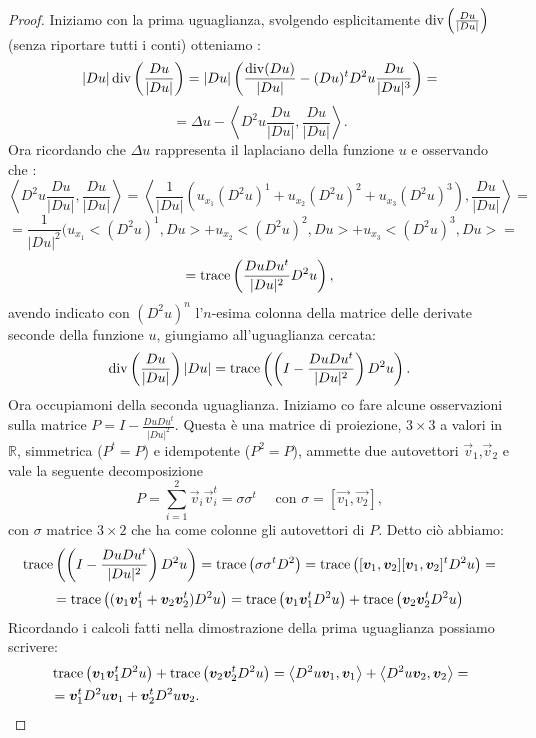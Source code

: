 \begin{proof}
Iniziamo con la prima uguaglianza, svolgendo esplicitamente $\operatorname{div}\left(\frac{Du}{|Du|}\right)$ (senza riportare tutti i conti) otteniamo :
\[
|Du|\operatorname{div}\left(\frac{Du}{|Du|}\right)=|Du|\left(\frac{\operatorname{div}(Du)}{|Du|} -(Du)^tD^2u\frac{Du}{|Du|^3}\right) =
\]
\[
= \Delta u - \left<D^2u\frac{Du}{|Du|},\frac{Du}{|Du|}\right> .
\]
Ora ricordando che $\Delta u$ rappresenta il laplaciano della funzione $u$ e osservando che :
\[
\left<D^2u\frac{Du}{|Du|},\frac{Du}{|Du|}\right> = \left<\frac{1}{|Du|}(u_{x_1}(D^2u)^1+u_{x_2}(D^2u)^2+u_{x_3}(D^2u)^3),\frac{Du}{|Du|}\right> =
\]
\[
=\frac{1}{|Du|^2}(u_{x_1}<(D^2u)^1,Du>+u_{x_2}<(D^2u)^2,Du>+u_{x_3}<(D^2u)^3,Du> = 
\]
\[
=\operatorname{trace}\left(\frac{DuDu^t}{|Du|^2}D^2u\right),
\]
avendo indicato con $(D^2u)^n$ l'$n$-esima colonna della matrice delle derivate seconde della funzione $u$, giungiamo all'uguaglianza cercata:
\[
\operatorname{div}\left(\frac{Du}{|Du|}\right)|Du| = \operatorname{trace}\left(\left(I-{\frac{DuDu^t}{|Du|^2}}\right)D^2u\right).
\] 
Ora occupiamoni della seconda uguaglianza. Iniziamo co fare alcune osservazioni sulla matrice $P=I-\frac{DuDu^t}{|Du|^2}$. Questa è una matrice di proiezione, $3\times3$ a valori in $\mathbb{R}$, simmetrica ($P^t=P$) e idempotente ($P^2=P$), ammette due autovettori $\vec{v}_1$,$\vec{v}_2$ e vale la seguente decomposizione
\[
P=\sum_{i=1}^2\vec{v}_i\vec{v}_i^t=\sigma\sigma^t\quad\text{ con } \sigma=[\vec{v_1},\vec{v_2}],
\]
con $\sigma$ matrice $3\times2$ che ha come colonne gli autovettori di $P$. Detto ciò abbiamo: 
\[
\operatorname{trace}\left(\left(I-{\frac{DuDu^t}{|Du|^2}}\right)D^2u\right)=\operatorname{trace}\left(\sigma\sigma^tD^2\right)=\operatorname{trace}\left([\bm{v}_1,\bm{v}_2][\bm{v}_1,\bm{v}_2]^tD^2u\right)=
\]
\[
=\operatorname{trace}\left((\bm{v}_1\bm{v}_1^t+\bm{v}_2\bm{v}_2^t)D^2u\right)=\operatorname{trace}\left(\bm{v}_1\bm{v}_1^tD^2u\right)+\operatorname{trace}\left(\bm{v}_2\bm{v}_2^tD^2u\right)
\]
Ricordando i calcoli fatti nella dimostrazione della prima uguaglianza possiamo scrivere:
\[
\begin{split}
&\operatorname{trace}\left(\bm{v}_1\bm{v}_1^tD^2u\right)+\operatorname{trace}\left(\bm{v}_2\bm{v}_2^tD^2u\right)=\left<D^2u\bm{v}_1,\bm{v}_1\right>+\left<D^2u\bm{v}_2,\bm{v}_2\right>=\\
& =\bm{v}_1^tD^2u\bm{v}_1+\bm{v}_2^tD^2u\bm{v}_2.
\end{split}
\]
\end{proof}

